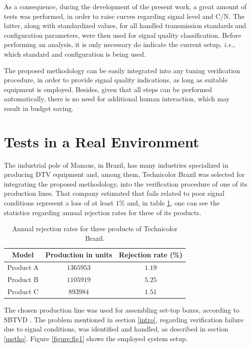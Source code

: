 \documentclass[conference]{IEEEtran}
\begin{document}
As a consequence, during the development of the present work, a great amount of tests was performed, in order to raise curves regarding signal level and C/N. The latter, along with standardized values, for all handled transmission standards and configuration parameters, were then used for signal quality classification. Before performing an analysis, it is only necessary do indicate the current setup, {\it i.e.}, which standard and configuration is being used.

The proposed methodology can be easily integrated into any tuning verification procedure, in order to provide signal quality indications, as long as suitable equipment is employed. Besides, given that all steps can be performed automatically, there is no need for additional human interaction, which may result in budget saving.

\section{Tests in a Real Environment}

The industrial pole of Manaus, in Brazil, has many industries specialized in producing DTV equipment and, among them, Technicolor Brazil was selected for integrating the proposed methodology, into the verification procedure of one of its production lines. That company estimated that fails related to poor signal conditions represent a loss of at least $1\%$ and, in table \ref{table:tab1}, one can see the statistics regarding annual rejection rates for three of its products.

\begin{table}[!htb]
\centering
\caption{Annual rejection rates for three products of Technicolor Brazil.}\label{table:tab1}
\begin{tabular}{|c c c|}
\hline
  		Model	& Production in units	& Rejection rate (\%)\\
\hline
Product A & $1365953$	& $1.19$\\
Product B & $1105919$	& $5.25$\\
Product C & $893984$	& $1.51$\\
\hline
\end{tabular}
\end{table}

The chosen production line was used for assembling set-top boxes, according to SBTVD \cite{sbtvd}. The problem mentioned in section \ref{intro}, regarding verification failure due to signal conditions, was identified and handled, as described in section \ref{metho}. Figure \ref{figure:fig1} shows the employed system setup.
\end{document}
